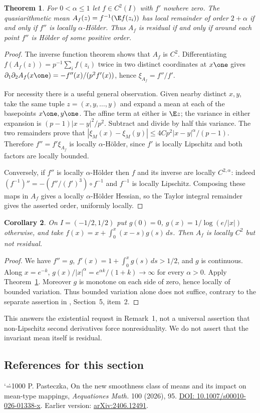\documentclass[11pt,a4paper]{article}
\makeatletter
\numberwithin{equation}{section}
\newtheorem{theorem}{Theorem}[section]
\newtheorem{corollary}[theorem]{Corollary}
\theoremstyle{definition}
\theoremstyle{remark}
\renewenvironment{thebibliography}[1]
 {\subsection*{References for this section}\small
  \list{\@biblabel{\@arabic\c@enumiv}}
       {\settowidth\labelwidth{\@biblabel{#1}}\leftmargin\labelwidth
        \advance\leftmargin\labelsep\@openbib@code
        \usecounter{enumiv}\let\p@enumiv\@empty
        \renewcommand\theenumiv{\@arabic\c@enumiv}}
  \sloppy\clubpenalty4000\widowpenalty4000\sfcode`\.=1000\relax}
 {\def\@noitemerr{\@latex@warning{Empty bibliography}}\endlist}
\makeatother
\begin{document}
\begin{theorem}\label{r28showa:t:q}
For $0<\alpha\le1$ let $f\in C^2(I)$ with $f'$ nowhere zero. The quasiarithmetic mean $A_f(z)=f^{-1}(\E f(z_i))$ has local remainder of order $2+\alpha$ if and only if $f''$ is locally $\alpha$-H\"older. Thus $A_f$ is residual if and only if around each point $f''$ is H\"older of some positive order.
\end{theorem}
\begin{proof}
The inverse function theorem shows that $A_f$ is $C^2$. Differentiating $f(A_f(z))=p^{-1}\sum_i f(z_i)$ twice in two distinct coordinates at $x\one$ gives $\partial_1\partial_2 A_f(x\one)=-f''(x)/(p^2 f'(x))$, hence $\xi_{A_f}=f''/f'$.

For necessity there is a useful general observation. Given nearby distinct $x,y$, take the same tuple $z=(x,y,\ldots,y)$ and expand a mean at each of the basepoints $x\one,y\one$. The affine term at either is $\E z$; the variance in either expansion is $(p-1)|x-y|^2/p^2$. Subtract and divide by half this variance. The two remainders prove that $|\xi_M(x)-\xi_M(y)|\le 4Cp^2|x-y|^\alpha/(p-1)$. Therefore $f''=f'\xi_{A_f}$ is locally $\alpha$-H\"older, since $f'$ is locally Lipschitz and both factors are locally bounded.

Conversely, if $f''$ is locally $\alpha$-H\"older then $f$ and its inverse are locally $C^{2,\alpha}$: indeed $(f^{-1})''=-(f''/(f')^3)\circ f^{-1}$ and $f^{-1}$ is locally Lipschitz. Composing these maps in $A_f$ gives a locally $\alpha$-H\"older Hessian, so the Taylor integral remainder gives the asserted order, uniformly locally.
\end{proof}
\begin{corollary}
On $I=(-1/2,1/2)$ put $g(0)=0$, $g(x)=1/\log(e/|x|)$ otherwise, and take
$f(x)=x+\int_0^x(x-s)g(s)\,ds$. Then $A_f$ is locally $C^2$ but not residual.
\end{corollary}
\begin{proof}
We have $f''=g$, $f'(x)=1+\int_0^x g(s)\,ds>1/2$, and $g$ is continuous. Along $x=e^{-k}$, $g(x)/|x|^\alpha=e^{\alpha k}/(1+k)\to\infty$ for every $\alpha>0$. Apply Theorem~\ref{r28showa:t:q}. Moreover $g$ is monotone on each side of zero, hence locally of bounded variation. Thus bounded variation alone does not suffice, contrary to the separate assertion in \cite{r28showa:p}, Section~5, item~2.
\end{proof}
\noindent This answers the existential request in Remark~1, not a universal assertion that non-Lipschitz second derivatives force nonresiduality. We do not assert that the invariant mean itself is residual.
\begin{thebibliography}{9}
 P. Pasteczka, On the new smoothness class of means and its impact on mean-type mappings, \emph{Aequationes Math.} 100 (2026), 95. \href{https://doi.org/10.1007/s00010-026-01338-x}{DOI: 10.1007/s00010-026-01338-x}. Earlier version: \href{https://arxiv.org/abs/2406.12491}{arXiv:2406.12491}.
\end{thebibliography}
\end{document}
